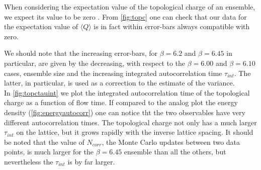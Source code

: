 When considering the expectation value of the topological charge of an ensemble, we expect its value to be zero \cite{ce_non-gaussianities_2015}. From \cref{fig:topc} one can check that our data for the expectation value of $\langle Q\rangle$ is in fact within error-bars always compatible with zero. 

We should note that the increasing error-bars, for $\beta = 6.2$ and $\beta = 6.45$ in particular, are given by the decreasing, with respect to the $\beta=6.00$ and $\beta=6.10$ cases, ensemble size and the increasing integrated autocorrelation time $\tau_{int}$. The latter, in particular, is used as a correction to the estimate of the variance. \\
In \cref{fig:topctauint} we plot the integrated autocorrelation time of the topological charge as a function of flow time. If compared to the analog plot the energy density (\cref{fig:energyautocorr}) one can notice tht the two observables have very different autocorrelation times. The topological charge not only has a much larger $\tau_{int}$ on the lattice, but it grows rapidly with the inverse lattice spacing. It should be noted that the value of $N_{corr}$, the Monte Carlo updates between two data points, is much larger for the $\beta=6.45$ ensemble than all the others, but nevertheless the $\tau_{int}$ is by far larger.

